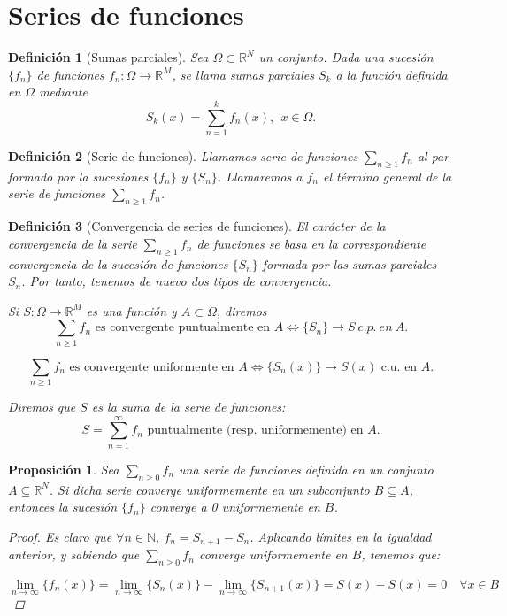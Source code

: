 \documentclass[11pt, a4paper]{article}
\newcommand{\N}{\mathbb{N}}
\newcommand{\fn}{\{f_n\}}
\theoremstyle{theorem-style}
\newtheorem*{nprop}{Proposición}
\theoremstyle{definition-style}
\newtheorem*{ndef}{Definición}
\theoremstyle{remark-style}
\theoremstyle{example-style}
\begin{document}
\newpage

\section{Series de funciones}

\begin{ndef}[Sumas parciales]
Sea $\Omega\subset \mathbb R^N$ un conjunto. 
Dada una sucesi\'on $\{f_n \}$ de funciones $f_n : \Omega \longrightarrow \mathbb R^M$, se llama sumas parciales $S_k$ a la funci\'on definida en $\Omega$ mediante
 \[ 
 S_k (x) = \sum_{n=1}^{k} f_n(x),\ \ x\in\Omega.
 \] 
\end{ndef}

\begin{ndef}[Serie de funciones]
Llamamos serie  de funciones $\sum_{n\geq 1} f_n$ al par formado por la sucesiones  $\{ f_n \}$ y $\{S_n\}$. Llamaremos a $f_n$ el t\'ermino general de la serie de funciones $\displaystyle\sum_{n\geq 1} f_n$.
\end{ndef}

\begin{ndef}[Convergencia de series de funciones]
El car\'acter de la convergencia de la serie $\sum_{n\geq 1} f_n$ de funciones se basa en la correspondiente convergencia de la sucesi\'on de funciones $\{S_n\}$ formada por las sumas parciales $S_n$. Por tanto, tenemos de nuevo dos tipos de convergencia.

Si $S:\Omega\longrightarrow \mathbb R^M$ es una funci\'on y $A\subset \Omega$, diremos 
$$\sum_{n\geq 1} f_n  \mbox{ es convergente puntualmente en } A \Leftrightarrow \{S_n \} \longrightarrow S\ c.p.\ en\ A.$$

$$\sum_{n\geq 1} f_n  \mbox{ es convergente uniformente en }A \Leftrightarrow \{S_n(x)\} \longrightarrow S(x) \mbox{ c.u. en }A.$$ 

Diremos que $S$ es la suma de la serie de funciones: 
\[
S=\displaystyle \sum_{n=1}^{\infty} f_n \mbox{ puntualmente (resp. uniformemente) en $A$.}
\]
\end{ndef}

\begin{nprop}
	Sea $\sum_{n \ge 0} f_n$ una serie de funciones definida en un conjunto $A \subseteq \mathbb{R}^N$. Si dicha serie converge uniformemente en un subconjunto $B \subseteq A$, entonces la sucesión $\fn$ converge a 0 uniformemente en $B$.
	
\begin{proof}
Es claro que $\forall n \in \N,\ f_n = S_{n+1} - S_n$. Aplicando límites en la igualdad anterior, y sabiendo que $\sum_{n\ge 0} f_n$ converge uniformemente en $B$, tenemos que: 

$$\lim_{n \to \infty} \{f_n(x)\} = \lim_{n \to \infty} \{S_n(x)\} - \lim_{n \to \infty} \{S_{n + 1}(x)\} = S(x) - S(x) = 0\quad \forall x \in B$$
\end{proof}
\end{nprop}
\end{document}
